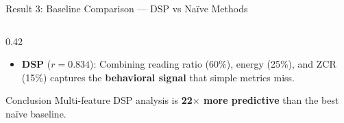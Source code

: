 \documentclass[aspectratio=169,10pt]{beamer}
\begin{document}
\begin{frame}{Result 3: Baseline Comparison --- DSP vs Na\"ive Methods}
\begin{columns}[T]
\begin{column}{0.42\textwidth}
\begin{itemize}
  \item \textbf{DSP} ($r=0.834$): Combining reading ratio (60\%), energy (25\%), and ZCR (15\%) captures the \textbf{behavioral signal} that simple metrics miss.
\end{itemize}

\vspace{4pt}
\begin{block}{\scriptsize Conclusion}
\scriptsize Multi-feature DSP analysis is \textbf{22$\times$ more predictive} than the best na\"ive baseline.
\end{block}
\end{column}
\end{columns}
\end{frame}

\end{document}
